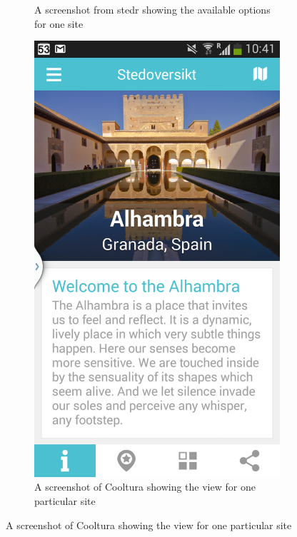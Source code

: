 \begin{figure}[h]
\begin{subfigure}[t]{0.3\textwidth}
		\caption{A screenshot from stedr showing the available options for one site}
		\label{Fig:stedr_screenshot}
	\end{subfigure}
	\hspace{0.5cm}
	\begin{subfigure}[t]{0.3\textwidth}
		\includegraphics[width=\textwidth]{fig/cooltura_screenshot2}
		\caption{A screenshot of Cooltura showing the view for one particular site}
		\label{Fig:cooltura_screenshot2}	
	\end{subfigure}	

\end{figure}
